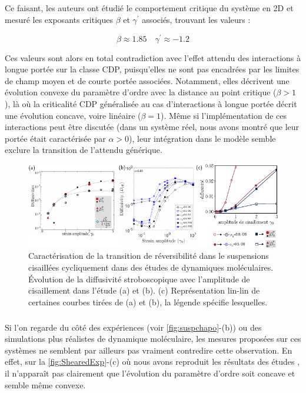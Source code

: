 \subparagraph{}Ce faisant, les auteurs ont étudié le comportement critique du système en 2D et mesuré les exposants critiques $\beta$ et $\gamma^\prime$ associés, trouvant les valeurs :

\begin{equation}
	\beta \approx 1.85 \quad \gamma^\prime \approx -1.2
\end{equation}

\noindent Ces valeurs sont alors en total contradiction avec l'effet attendu des interactions à longue portée sur la classe CDP, puisqu'elles ne sont pas encadrées par les limites de champ moyen et de courte portée associées. Notamment, elles décrivent une évolution convexe du paramètre d'ordre avec la distance au point critique ($\beta >1$), là où la criticalité CDP généralisée au cas d'interactions à longue portée décrit une évolution concave, voire linéaire ($\beta = 1$). Même si l'implémentation de ces interactions peut être discutée (dans un système réel, nous avons montré que leur portée était caractérisée par $\alpha > 0$), leur intégration dans le modèle semble exclure la transition de l'attendu générique.


\begin{figure}[h]
	\centering
	\includegraphics[width=\textwidth]{Chapitre1/Figures/LongRange/ExpShear.pdf}
	\caption{Caractérisation de la transition de réversibilité dans le suspensions cisaillées cycliquement dans des études de dynamiques moléculaires. Évolution de la diffusivité stroboscopique avec l'amplitude de cisaillement dans l'étude \cite{metzger_irreversibility_2010} (a) et \cite{agrawal_dense_2024} (b). (c) Représentation lin-lin de certaines courbes tirées de (a) et (b), la légende spécifie lesquelles.}
	\label{fig:ShearedExp}
\end{figure}

\subparagraph{}Si l'on regarde du côté des expériences (voir \autoref{fig:suspchapo}-(b)) ou des simulations plus réalistes de dynamique moléculaire, les mesures proposées sur ces systèmes ne semblent par ailleurs pas vraiment contredire cette observation. En effet, sur la \autoref{fig:ShearedExp}-(c) où nous avons reproduit les résultats des études \cite{metzger_irreversibility_2010, agrawal_dense_2024}, il n'apparaît pas clairement que l'évolution du paramètre d'ordre soit concave et semble même convexe. 

